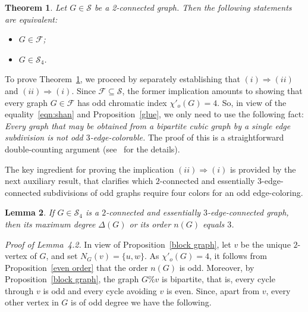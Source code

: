 \documentclass[a4paper,12pt]{article}
\newtheorem{theorem}{Theorem}[section]
\newtheorem{lemma}[theorem]{Lemma}
\numberwithin{equation}{section}
\begin{document}
\begin{theorem}
    \label{2-connected}
Let $G\in \mathcal{S}$ be a 2-connected graph. Then the following statements are equivalent:
\begin{itemize}
\item[$(i)$] $G\in \mathcal{F}$;
\item[$(ii)$] $G\in \mathcal{S}_4$.

\end{itemize}
\end{theorem}

\medskip

To prove Theorem~\ref{2-connected}, we proceed by separately establishing that $(i)\Rightarrow (ii)$ and $(ii)\Rightarrow (i)$. Since $\mathcal{F}\subseteq \mathcal{S}$, the former implication amounts to showing that every graph $G\in\mathcal{F}$ has odd chromatic index $\chi'_o(G)=4$. So, in view of the equality~\eqref{eqn:shan} and Proposition~\ref{glue}, we only need to use the following fact: \textit{Every graph that may be obtained from a bipartite cubic graph by a single edge subdivision is not odd $3$-edge-colorable.} The proof of this is a straightforward double-counting argument (see~\cite{AtaPetSkr16} for the details).

\smallskip

The key ingredient for proving the implication $(ii)\Rightarrow (i)$ is provided by the next auxiliary result, that clarifies which $2$-connected and essentially $3$-edge-connected subdivisions of odd graphs require four colors for an odd edge-coloring.

\medskip

\begin{lemma}
    \label{lema}
If $G\in\mathcal{S}_4$ is a $2$-connected and essentially $3$-edge-connected graph, then its maximum degree $\Delta(G)$ or its order $n(G)$ equals $3$.
\end{lemma}

\medskip

\noindent \textit{Proof of Lemma~4.2.} In view of Proposition~\ref{block graph}, let $v$ be the unique $2$-vertex of $G$, and set $N_G(v)=\{u,w\}$. As $\chi'_o(G)=4$, it follows from Proposition~\ref{even order} that the order $n(G)$ is odd. Moreover, by Proposition~\ref{block graph}, the graph $G\%v$ is bipartite, that is, every cycle through $v$ is odd and every cycle avoiding $v$ is even. Since, apart from $v$, every other vertex in $G$ is of odd degree we have the following.

\bigskip
\end{document}
